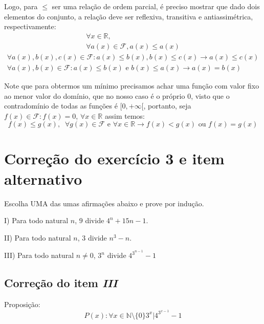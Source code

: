 \documentclass{article}
\begin{document}
    Logo, para $\leq$ ser uma relação de ordem parcial, é preciso
    mostrar que dado dois elementos do conjunto, a relação deve
    ser reflexiva, transitiva e antiassimétrica, respectivamente:
    \begin{equation*}
        \begin{aligned}
            \forall x\in\mathbb{R}, \\
            \forall a(x)\in\mathcal{F}, a(x)\leq a(x)
        \end{aligned}
    \end{equation*}
    \begin{equation*}
        \begin{aligned}
            \forall a(x),b(x),c(x)\in\mathcal{F} : a(x)\leq b(x),
            b(x)\leq c(x)\rightarrow a(x)\leq c(x) \\
            \forall a(x),b(x)\in\mathcal{F} : a(x)\leq b(x)
            \text{ e }b(x)\leq a(x)\rightarrow a(x) = b(x)
        \end{aligned}
    \end{equation*}

    Note que para obtermos um mínimo precisamos achar uma função
    com valor fixo ao menor valor do domínio, que no nosso caso
    é o próprio $0$, visto que o contradomínio de todas as
    funções é $[0, +\infty[$, portanto, seja $f(x)\in\mathcal{F}
    : f(x) = 0$, $\forall x\in\mathbb{R}$ assim temos:
    \begin{equation*}
        f(x)\leq g(x),\;\;\forall g(x)\in\mathcal{F}\text{ e }
        \forall x\in\mathbb{R}\rightarrow f(x)<g(x)\text{ ou }
        f(x)=g(x)
    \end{equation*}

    \section{Correção do exercício 3 e item alternativo}
    Escolha UMA das umas afirmações abaixo e prove por indução.
    
    I) Para todo natural $n$, $9$ divide $4^n + 15n - 1$.
    
    II) Para todo natural $n$, $3$ divide $n^3 - n$.
    
    III) Para todo natural $n\neq 0$, $3^n$ divide
    $4^{3^{n-1}} - 1$
    \subsection*{Correção do item \emph{III}}
    Proposição:
    \begin{equation*}
        P(x): \forall x\in\mathbb{N}\setminus\{0\}
        3^x|4^{3^{x-1}}-1
    \end{equation*}
\end{document}
